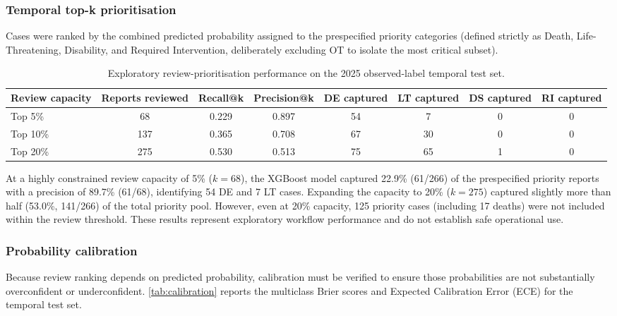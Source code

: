 \documentclass[10pt]{article}
\begin{document}
\subsubsection{Temporal top-k prioritisation}
Cases were ranked by the combined predicted probability assigned to the prespecified priority categories (defined strictly as Death, Life-Threatening, Disability, and Required Intervention, deliberately excluding OT to isolate the most critical subset). 

\begin{table}[htbp]
\caption{Exploratory review-prioritisation performance on the 2025 observed-label temporal test set.}
\label{tab:temporal_topk}
\centering\small\setlength{\tabcolsep}{4pt}
\begin{tabularx}{\textwidth}{|>{\raggedright\arraybackslash}X|c|c|c|c|c|c|c|}
\hline
\textbf{Review capacity} & \textbf{Reports reviewed} & \textbf{Recall@k} & \textbf{Precision@k} & \textbf{DE captured} & \textbf{LT captured} & \textbf{DS captured} & \textbf{RI captured} \\
\hline
Top 5\% & 68 & 0.229 & 0.897 & 54 & 7 & 0 & 0 \\
\hline
Top 10\% & 137 & 0.365 & 0.708 & 67 & 30 & 0 & 0 \\
\hline
Top 20\% & 275 & 0.530 & 0.513 & 75 & 65 & 1 & 0 \\
\hline
\end{tabularx}
\end{table}

At a highly constrained review capacity of 5\% ($k=68$), the XGBoost model captured 22.9\% (61/266) of the prespecified priority reports with a precision of 89.7\% (61/68), identifying 54 DE and 7 LT cases. Expanding the capacity to 20\% ($k=275$) captured slightly more than half (53.0\%, 141/266) of the total priority pool. However, even at 20\% capacity, 125 priority cases (including 17 deaths) were not included within the review threshold. These results represent exploratory workflow performance and do not establish safe operational use.

\subsubsection{Probability calibration}
Because review ranking depends on predicted probability, calibration must be verified to ensure those probabilities are not substantially overconfident or underconfident. \cref{tab:calibration} reports the multiclass Brier scores and Expected Calibration Error (ECE) for the temporal test set.
\end{document}
